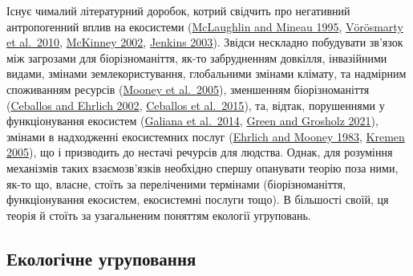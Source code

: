 \documentclass[
  11pt,
]{book}
\begin{document}
Існує чималий літературний доробок, котрий свідчить про негативний антропогенний вплив на екосистеми (\href{htpps://doi.org/10.1016/0167-8809(95)00609-V}{McLaughlin and Mineau 1995}, \href{https://doi.org/10.1038/nature09440}{Vörösmarty et al.~2010}, \href{https://academic.oup.com/bioscience/article/52/10/883-890/354714}{McKinney 2002}, \href{https://doi.org/10.1126/science.1088666}{Jenkins 2003}). Звідси нескладно побудувати зв'язок між загрозами для біорізноманіття, як-то забрудненням довкілля, інвазійними видами, змінами землекористування, глобальними змінами клімату, та надмірним споживанням ресурсів (\href{https://www.millenniumassessment.org/}{Mooney et al.~2005}), зменшенням біорізноманіття (\href{https://doi.org/10.1126/science.1069349}{Ceballos and Ehrlich 2002}, \href{https://doi.org/10.1126/sciadv.1400253}{Ceballos et al.~2015}), та, відтак, порушеннями у функціонування екосистем (\href{https://doi.org/10.1111/j.1600-0706.2013.00859.x}{Galiana et al.~2014}, \href{https://doi.org/https://doi.org/10.1002/fee.2277}{Green and Grosholz 2021}), змінами в надходженні екосистемних послуг (\href{https://doi.org/10.2307/1309037}{Ehrlich and Mooney 1983}, \href{https://doi.org/10.1111/j.1461-0248.2005.00751.x}{Kremen 2005}), що і призводить до нестачі речурсів для людства. Однак, для розуміння механізмів таких взаємозв'язків необхідно спершу опанувати теорію поза ними, як-то що, власне, стоїть за переліченими термінами (біорізноманіття, функціонування екосистем, екосистемні послуги тощо). В більшості своїй, ця теорія й стоїть за узагальненим поняттям екології угруповань.

\subsection{Екологічне угруповання}\label{community-def}
\end{document}

